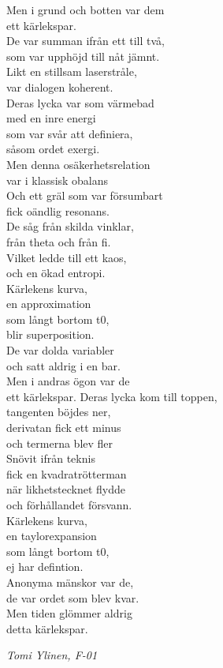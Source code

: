 \documentclass[a6paper,10pt]{article}
\begin{document}
Men i grund och botten var dem \\
ett kärlekspar.
\vspace{5pt}\\
De var summan ifrån ett till två, \\
som var upphöjd till nåt jämnt. \\
Likt en stillsam laserstråle, \\
var dialogen koherent. \\
Deras lycka var som värmebad \\
med en inre energi \\
som var svår att definiera, \\
såsom ordet exergi.
\vspace{5pt}\\
Men denna osäkerhetsrelation \\
var i klassisk obalans \\
Och ett gräl som var försumbart \\
fick oändlig resonans. \\
De såg från skilda vinklar, \\
från theta och från fi. \\
Vilket ledde till ett kaos, \\
och en ökad entropi.
\vspace{5pt}\\
Kärlekens kurva, \\
en approximation \\
som långt bortom t0, \\
blir superposition. \\
De var dolda variabler \\
och satt aldrig i en bar. \\
Men i andras ögon var de \\
ett kärlekspar. 
\newpage
\setlength{\oddsidemargin}{-0.37in}
\noindent
Deras lycka kom till toppen, \\
tangenten böjdes ner, \\
derivatan fick ett minus \\
och termerna blev fler \\
Snövit ifrån teknis \\
fick en kvadratrötterman \\
när likhetstecknet flydde \\
och förhållandet försvann.
\vspace{5pt}\\
Kärlekens kurva, \\
en taylorexpansion \\
som långt bortom t0, \\
ej har defintion. \\
Anonyma mänskor var de, \\
de var ordet som blev kvar. \\
Men tiden glömmer aldrig \\
detta kärlekspar.
\begin{flushright}
\textit{Tomi Ylinen, F-01}
\end{flushright}
\end{document}
